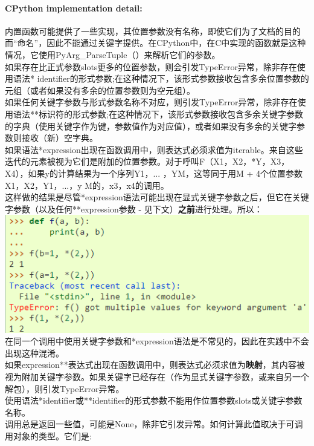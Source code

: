 \documentclass[10pt,UTF8]{ctexart}
\begin{document}
\paragraph{CPython implementation detail:}内置函数可能提供了一些实现，其位置参数没有名称，即使它们为了文档的目的而“命名”，因此不能通过关键字提供。在CPython中，在C中实现的函数就是这种情况，它使用PyArg_ParseTuple（）来解析它们的参数。\\
\indent 如果存在比正式参数slots更多的位置参数，则会引发TypeError异常，除非存在使用语法* identifier的形式参数;在这种情况下，该形式参数接收包含多余位置参数的元组（或者如果没有多余的位置参数则为空元组）。\\
\indent 如果任何关键字参数与形式参数名称不对应，则引发TypeError异常，除非存在使用语法**标识符的形式参数;在这种情况下，该形式参数接收包含多余关键字参数的字典（使用关键字作为键，参数值作为对应值），或者如果没有多余的关键字参数则接收（新）空字典。\\
\indent 如果语法*expression出现在函数调用中，则表达式必须求值为iterable。来自这些迭代的元素被视为它们是附加的位置参数。对于呼叫F（X1，X2，*Y，X3，X4），如果y的计算结果为一个序列Y1，... ，YM，这等同于用M + 4个位置参数X1，X2，Y1，...，y M的，x3，x4的调用。\\
\indent 这样做的结果是尽管*expression语法可能出现在显式关键字参数之后，但它在关键字参数（以及任何**expression参数 - 见下文）\textbf{之前}进行处理。所以：\\
\includegraphics[scale=1]{arg.jpg} \\
\indent 在同一个调用中使用关键字参数和*expression语法是不常见的，因此在实践中不会出现这种混淆。\\
\indent 如果expression**表达式出现在函数调用中，则表达式必须求值为\textbf{映射}，其内容被视为附加关键字参数。如果关键字已经存在（作为显式关键字参数，或来自另一个解包），则引发TypeError异常。\\
\indent 使用语法*identifier或**identifier的形式参数不能用作位置参数slots或关键字参数名称。\\
\indent 调用总是返回一些值，可能是None，除非它引发异常。如何计算此值取决于可调用对象的类型。它们是:\\
\end{document}
